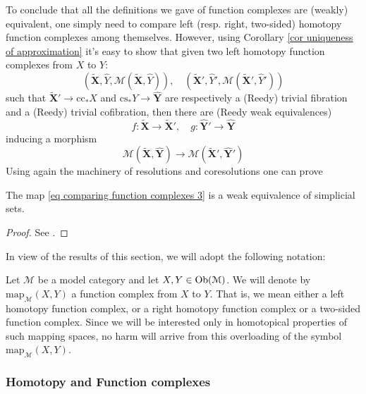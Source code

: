 \begin{refsection}
To conclude that all the definitions we gave of function complexes are (weakly) equivalent, one simply need to compare left (resp. right, two-sided) homotopy function complexes among themselves. However, using Corollary \ref{cor uniqueness of approximation} it's easy to show that given two left homotopy function complexes from $X$ to $Y$:
\[
\left( \widetilde{\mathbf X}, \widehat{Y}, \mathcal M(\widetilde{\mathbf X}, \widehat{Y}) \right), \quad \left( \widetilde{\mathbf X}', \widehat{Y}', \mathcal M(\widetilde{\mathbf X}', \widehat{Y}') \right)
\]
such that $\widetilde{\mathbf X}' \to \mathrm{cc}_* X$ and $\mathrm{cs}_* Y \to \widehat{\mathbf Y}$ are respectively a (Reedy) trivial fibration and a (Reedy) trivial cofibration, then there are (Reedy weak equivalences)
\[
f \colon \widetilde{\mathbf X} \to \widetilde{\mathbf X}', \quad g \colon \widehat{\mathbf Y}' \to \widehat{\mathbf Y}
\]
inducing a morphism
\begin{equation} \label{eq comparing function complexes 3}
\mathcal M(\widetilde{\mathbf X}, \widehat{\mathbf Y}) \to \mathcal M( \widetilde{\mathbf X}', \widehat{\mathbf Y}')
\end{equation}
Using again the machinery of resolutions and coresolutions one can prove

\begin{thm}
The map \eqref{eq comparing function complexes 3} is a weak equivalence of simplicial sets.
\end{thm}

\begin{proof}
See \cite[Proposition 17.1.10]{hirschhorn}.
\end{proof}

In view of the results of this section, we will adopt the following notation:

\begin{notation}
Let $\mathcal M$ be a model category and let $X,Y \in \operatorname{Ob}(\mathcal M)$. We will denote by $\mathrm{map}_{\mathcal M}(X,Y)$ a function complex from $X$ to $Y$. That is, we mean either a left homotopy function complex, or a right homotopy function complex or a two-sided function complex. Since we will be interested only in homotopical properties of such mapping spaces, no harm will arrive from this overloading of the symbol $\mathrm{map}_{\mathcal M}(X,Y)$.
\end{notation}

\subsubsection*{Homotopy and Function complexes}


\end{refsection}
